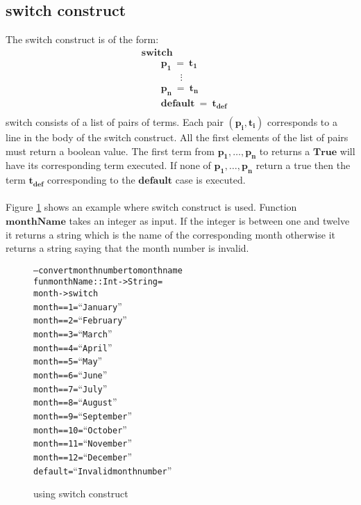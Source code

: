 \documentclass[11pt]{article}
\begin{document}
\subsection {switch construct}
The {\sf switch} construct is of the form:
\begin{align*} 
&\mathbf{switch}\\
&\qquad\mathbf{p_1~=~t_1} \\
&\qquad\mathbf{\qquad \vdots} \\
&\qquad\mathbf{p_n~=~t_n}\\
&\qquad\mathbf{default~=~t_{def}}\\
\end{align*}
{\sf switch} consists of a list of pairs of terms. Each pair $\mathbf{(p_i,t_i)}$ corresponds to a line in the body of the {\sf switch} construct. All the first elements of the list of pairs must return a boolean value. The first term from $\mathbf{p_1,\ldots,p_n}$ to returns a $\mathbf{True}$ will have its corresponding term executed. If none of $\mathbf{p_1,\ldots,p_n}$ return a true then the term $\mathbf{t_{def}}$ corresponding to the $\mathbf{default}$ case is executed.
~~\\~~\\ 
Figure \ref {seqMPL:switchExam} shows an example where {\sf switch} construct is used. 
Function $\mathbf{monthName}$ takes an integer as input. If the integer is between one and twelve it returns a string which is the name of the corresponding month otherwise it returns a string saying that the month number is invalid.
\begin{figure}[!h]
\begin{alltt}
                -- convert month number to month name
                fun monthName :: Int -> String =
                  month -> switch
                               month == 1 = ``January''
                               month == 2 = ``February''
                               month == 3 = ``March''
                               month == 4 = ``April''
                               month == 5 = ``May''
                               month == 6 = ``June''
                               month == 7 = ``July''
                               month == 8 = ``August''
                               month == 9 = ``September''
                               month == 10 = ``October''
                               month == 11 = ``November''
                               month == 12 = ``December''
                               default     = ``Invalid month number''
\end{alltt} 
\caption{using switch construct}
\label{seqMPL:switchExam}
\end{figure} 
\end{document}

